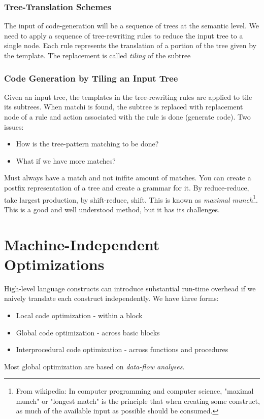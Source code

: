 \documentclass{article}
\begin{document}
\subsubsection{Tree-Translation Schemes} %
\label{ssub:Tree-Translation Schemes}
The input of code-generation will be a sequence of trees at the semantic level. We need to apply a sequence of tree-rewriting rules to reduce the input tree to a single node. Each rule represents the translation of a portion of the tree given by the template. The replacement is called \emph{tiling} of the subtree

\subsubsection{Code Generation by Tiling an Input Tree} %
\label{ssub:Code Generation by Tiling an Input Tree}
Given an input tree, the templates in the tree-rewriting rules are applied to tile its subtrees. When matchi is found, the subtree is replaced with replacement node of a rule and action associated with the rule is done (generate code). Two issues:
\begin{itemize}
	\item How is the tree-pattern matching to be done?
	\item What if we have more matches?
\end{itemize}
Must always have a match and not inifite amount of matches. You can create a postfix representation of a tree and create a grammar for it. By reduce-reduce, take largest production, by shift-reduce, shift. This is known as \emph{maximal munch}\footnote{From wikipedia: In computer programming and computer science, "maximal munch" or "longest match" is the principle that when creating some construct, as much of the available input as possible should be consumed.}. This is a good and well understood method, but it has its challenges.



\section{Machine-Independent Optimizations} %
\label{sec:Machine-Independent Optimizations}
High-level language constructs can introduce substantial run-time overhead if we naively translate each construct independently. We have three forms:
\begin{itemize}
	\item Local code optimization - within a block
	\item Global code optimization - across basic blocks
	\item Interprocedural code optimization - across functions and procedures
\end{itemize}
Most global optimization are based on \emph{data-flow analyses}.
\end{document}
